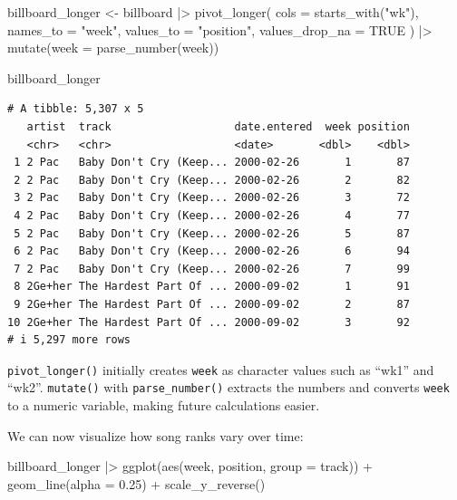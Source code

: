 \documentclass[
  letterpaper,
  DIV=11,
  numbers=noendperiod]{scrreprt}
\newenvironment{Shaded}{\begin{snugshade}}{\end{snugshade}}
\newcommand{\AttributeTok}[1]{\textcolor[rgb]{0.40,0.45,0.13}{#1}}
\newcommand{\ConstantTok}[1]{\textcolor[rgb]{0.56,0.35,0.01}{#1}}
\newcommand{\FloatTok}[1]{\textcolor[rgb]{0.68,0.00,0.00}{#1}}
\newcommand{\FunctionTok}[1]{\textcolor[rgb]{0.28,0.35,0.67}{#1}}
\newcommand{\NormalTok}[1]{\textcolor[rgb]{0.00,0.23,0.31}{#1}}
\newcommand{\OtherTok}[1]{\textcolor[rgb]{0.00,0.23,0.31}{#1}}
\newcommand{\SpecialCharTok}[1]{\textcolor[rgb]{0.37,0.37,0.37}{#1}}
\newcommand{\StringTok}[1]{\textcolor[rgb]{0.13,0.47,0.30}{#1}}
\begin{document}
\begin{Shaded}
\begin{Highlighting}[]
\NormalTok{billboard\_longer }\OtherTok{\textless{}{-}}\NormalTok{ billboard }\SpecialCharTok{|\textgreater{}}
  \FunctionTok{pivot\_longer}\NormalTok{(}
    \AttributeTok{cols =} \FunctionTok{starts\_with}\NormalTok{(}\StringTok{"wk"}\NormalTok{),}
    \AttributeTok{names\_to =} \StringTok{"week"}\NormalTok{,}
    \AttributeTok{values\_to =} \StringTok{"position"}\NormalTok{,}
    \AttributeTok{values\_drop\_na =} \ConstantTok{TRUE}
\NormalTok{  ) }\SpecialCharTok{|\textgreater{}}
  \FunctionTok{mutate}\NormalTok{(}\AttributeTok{week =} \FunctionTok{parse\_number}\NormalTok{(week))}

\NormalTok{billboard\_longer}
\end{Highlighting}
\end{Shaded}

\begin{verbatim}
# A tibble: 5,307 x 5
   artist  track                   date.entered  week position
   <chr>   <chr>                   <date>       <dbl>    <dbl>
 1 2 Pac   Baby Don't Cry (Keep... 2000-02-26       1       87
 2 2 Pac   Baby Don't Cry (Keep... 2000-02-26       2       82
 3 2 Pac   Baby Don't Cry (Keep... 2000-02-26       3       72
 4 2 Pac   Baby Don't Cry (Keep... 2000-02-26       4       77
 5 2 Pac   Baby Don't Cry (Keep... 2000-02-26       5       87
 6 2 Pac   Baby Don't Cry (Keep... 2000-02-26       6       94
 7 2 Pac   Baby Don't Cry (Keep... 2000-02-26       7       99
 8 2Ge+her The Hardest Part Of ... 2000-09-02       1       91
 9 2Ge+her The Hardest Part Of ... 2000-09-02       2       87
10 2Ge+her The Hardest Part Of ... 2000-09-02       3       92
# i 5,297 more rows
\end{verbatim}

\texttt{pivot\_longer()} initially creates \texttt{week} as character
values such as ``wk1'' and ``wk2''. \texttt{mutate()} with
\texttt{parse\_number()} extracts the numbers and converts \texttt{week}
to a numeric variable, making future calculations easier.

We can now visualize how song ranks vary over time:

\begin{Shaded}
\begin{Highlighting}[]
\NormalTok{billboard\_longer }\SpecialCharTok{|\textgreater{}}
  \FunctionTok{ggplot}\NormalTok{(}\FunctionTok{aes}\NormalTok{(week, position, }\AttributeTok{group =}\NormalTok{ track)) }\SpecialCharTok{+}
  \FunctionTok{geom\_line}\NormalTok{(}\AttributeTok{alpha =} \FloatTok{0.25}\NormalTok{) }\SpecialCharTok{+}
  \FunctionTok{scale\_y\_reverse}\NormalTok{()}
\end{Highlighting}
\end{Shaded}
\end{document}
